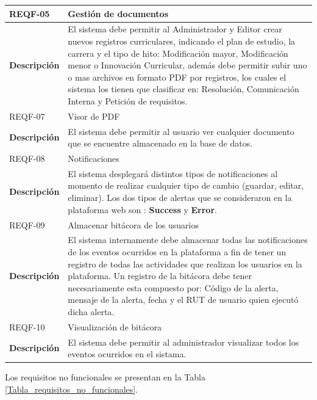 \begin{longtable}{l |p{11cm}}
		\rowcolor{LightBlue2} REQF-05 & Gestión de documentos\\  \hline
		\textbf{Descripción} & El sistema debe permitir al Administrador y Editor crear nuevos registros curriculares, indicando el plan de estudio, la carrera y el tipo de hito: Modificación mayor, Modificación menor o Innovación Curricular, además  debe permitir subir uno o mas archivos en formato PDF por registros, los cuales el sistema los  tienen que clasificar en: Resolución, Comunicación Interna y Petición de requisitos.\\  \hline
		
		\rowcolor{LightBlue2} REQF-07 & Visor de PDF\\  \hline
		\textbf{Descripción} & El sistema debe permitir al usuario ver  cualquier documento que se encuentre almacenado en la base de datos.\\  \hline \hline
		
		
		\rowcolor{LightBlue2} REQF-08 & Notificaciones\\  \hline
		\textbf{Descripción} & El sistema desplegará distintos tipos de notificaciones al momento de realizar cualquier tipo de cambio (guardar, editar, eliminar). Los dos tipos de alertas que se consideraron en la plataforma web son : \textbf{Success} y \textbf{Error}. \\  \hline \hline
		
		\rowcolor{LightBlue2} REQF-09 & Almacenar bitácora de los usuarios\\  \hline
		\textbf{Descripción} & El sistema internamente debe almacenar todas las notificaciones de los eventos ocurridos en la plataforma a fin de tener un registro de  todas  las actividades  que realizan los usuarios en la plataforma. Un registro de la bitácora debe tener necesariamente esta compuesto por: Código de la alerta, mensaje de la alerta, fecha y el RUT de usuario quien ejecutó dicha alerta.\\  \hline
		
		\rowcolor{LightBlue2} REQF-10 & Visualización de bitácora\\  \hline
		\textbf{Descripción} & El sistema debe permitir al administrador visualizar todos los eventos ocurridos en el sistama.\\ 
	
	\end{longtable}

	Los requisitos no funcionales se presentan en la Tabla \ref{Tabla_requisitos_no_funcionales}.
	\\

